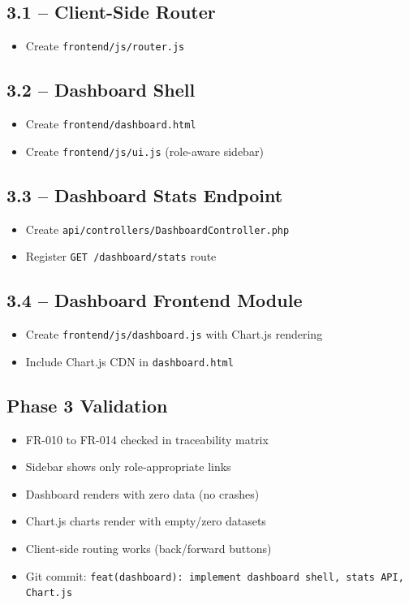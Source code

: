 \documentclass[11pt,a4paper]{article}
\newcommand{\undone}{\textcolor{helixgray}{\texttt{[ ] }}}
\newcommand{\filepath}[1]{\texttt{\small#1}}
\newcommand{\task}[2]{\item[#1] #2}
\begin{document}
\subsection{3.1 -- Client-Side Router}

\begin{itemize}
    \task{\undone}{Create \filepath{frontend/js/router.js}}
\end{itemize}

\subsection{3.2 -- Dashboard Shell}

\begin{itemize}
    \task{\undone}{Create \filepath{frontend/dashboard.html}}
    \task{\undone}{Create \filepath{frontend/js/ui.js} (role-aware sidebar)}
\end{itemize}

\subsection{3.3 -- Dashboard Stats Endpoint}

\begin{itemize}
    \task{\undone}{Create \filepath{api/controllers/DashboardController.php}}
    \task{\undone}{Register \texttt{GET /dashboard/stats} route}
\end{itemize}

\subsection{3.4 -- Dashboard Frontend Module}

\begin{itemize}
    \task{\undone}{Create \filepath{frontend/js/dashboard.js} with Chart.js rendering}
    \task{\undone}{Include Chart.js CDN in \filepath{dashboard.html}}
\end{itemize}

\subsection{Phase 3 Validation}

\begin{itemize}
    \task{\undone}{FR-010 to FR-014 checked in traceability matrix}
    \task{\undone}{Sidebar shows only role-appropriate links}
    \task{\undone}{Dashboard renders with zero data (no crashes)}
    \task{\undone}{Chart.js charts render with empty/zero datasets}
    \task{\undone}{Client-side routing works (back/forward buttons)}
    \task{\undone}{Git commit: \texttt{feat(dashboard): implement dashboard shell, stats API, Chart.js}}
\end{itemize}
\end{document}
